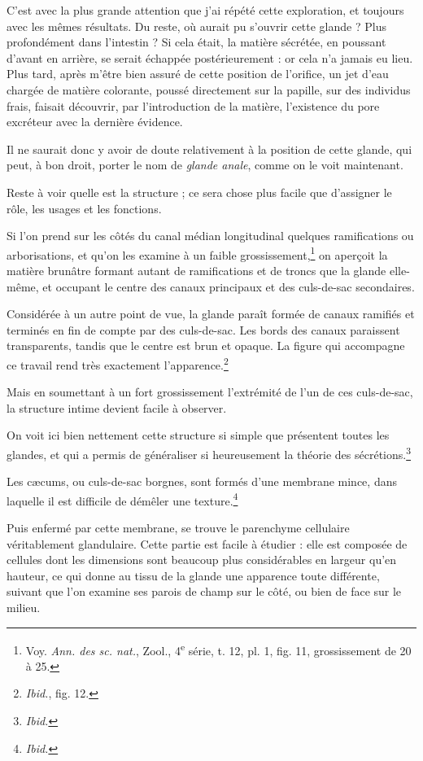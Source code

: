 \documentclass[a4paper, 11pt, oneside, polutonikogreek, french]{article}
\begin{document}
C'est avec la plus grande attention que j'ai répété cette exploration, et toujours avec les mêmes résultats. Du reste, où aurait pu s'ouvrir cette glande ? Plus profondément dans l'intestin ? Si cela était, la matière sécrétée, en poussant d'avant en arrière, se serait échappée postérieurement : or cela n'a jamais eu lieu. Plus tard, après m'être bien assuré de cette position de l'orifice, un jet d'eau chargée de matière colorante, poussé directement sur la papille, sur des individus frais, faisait découvrir, par l'introduction de la matière, l'existence du pore excréteur avec la dernière évidence.

Il ne saurait donc y avoir de doute relativement à la position de cette glande, qui peut, à bon droit, porter le nom de \emph{glande anale}, comme on le voit maintenant.

Reste à voir quelle est la structure ; ce sera chose plus facile que d'assigner le rôle, les usages et les fonctions.

Si l'on prend sur les côtés du canal médian longitudinal quelques ramifications ou arborisations, et qu'on les examine à un faible grossissement,\footnote{Voy. \emph{Ann. des sc. nat.}, Zool., 4\textsuperscript{e} série, t. 12, pl. 1, fig. 11, grossissement de 20 à 25.} on aperçoit la matière brunâtre formant autant de ramifications et de troncs que la glande elle-même, et occupant le centre des canaux principaux et des culs-de-sac secondaires.

Considérée à un autre point de vue, la glande paraît formée de canaux ramifiés et terminés en fin de compte par des culs-de-sac. Les bords des canaux paraissent transparents, tandis que le centre est brun et opaque. La figure qui accompagne ce travail rend très exactement l'apparence.\footnote{\emph{Ibid.}, fig. 12.}

Mais en soumettant à un fort grossissement l'extrémité de l'un de ces culs-de-sac, la structure intime devient facile à observer.

On voit ici bien nettement cette structure si simple que présentent toutes les glandes, et qui a permis de généraliser si heureusement la théorie des sécrétions.\footnote{\emph{Ibid.}}

Les cæcums, ou culs-de-sac borgnes, sont formés d'une membrane mince, dans laquelle il est difficile de démêler une texture.\footnote{\emph{Ibid.}}

Puis enfermé par cette membrane, se trouve le parenchyme cellulaire véritablement glandulaire. Cette partie est facile à étudier : elle est composée de cellules dont les dimensions sont beaucoup plus considérables en largeur qu'en hauteur, ce qui donne au tissu de la glande une apparence toute différente, suivant que l'on examine ses parois de champ sur le côté, ou bien de face sur le milieu.
\end{document}
